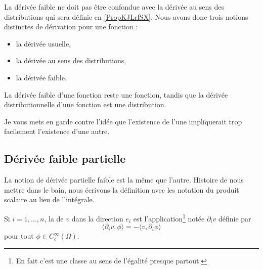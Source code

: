 \begin{remark}      \label{REMooBGJFooPBkFqm}
	La dérivée faible ne doit pas être confondue avec la dérivée au sens des distributions qui sera définie en \ref{PropKJLrfSX}. Nous avons donc trois notions distinctes de dérivation pour une fonction :
	\begin{itemize}
		\item la dérivée usuelle,
		\item la dérivée au sens des distributions,
		\item la dérivée faible.
	\end{itemize}
	La dérivée faible d'une fonction reste une fonction, tandis que la dérivée distributionnelle d'une fonction est une distribution.

	Je vous mets en garde contre l'idée que l'existence de l'une impliquerait trop facilement l'existence d'une autre.
\end{remark}

\subsection{Dérivée faible partielle}

La notion de dérivée partielle faible est la même que l'autre. Histoire de nous mettre dans le bain, nous écrivons la définition avec les notation du produit scalaire au lieu de l'intégrale.

\begin{definition}      \label{DEFooBRFCooPncSCE}
	Si \( i=1,\ldots, n\), la  de \( v\) dans la direction \( e_i\) est l'application\footnote{En fait c'est une classe au sens de l'égalité presque partout.} notée \( \partial_iv\) définie par
	\begin{equation}        \label{EQooMRZUooFoqPqv}
		\langle \partial_iv, \phi\rangle =-\langle v, \partial_i\phi\rangle
	\end{equation}
	pour tout \( \phi\in  C^{\infty}_c(\Omega)\).
\end{definition}

